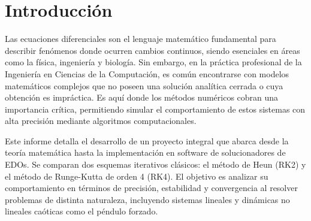 	\begin{abstract}
		Este proyecto presenta la implementación, análisis y validación de métodos numéricos para la resolución de ecuaciones diferenciales ordinarias (EDO). Se desarrollaron algoritmos en Python para el método de Heun (Runge-Kutta de orden 2) y Runge-Kutta de orden 4 (RK4). Los métodos fueron puestos a prueba resolviendo problemas de valor inicial de primer y segundo orden, así como sistemas de ecuaciones lineales y no lineales (Péndulo Forzado). Se derivaron las soluciones analíticas exactas para validar la precisión de los algoritmos. Los resultados demuestran una superioridad significativa del método RK4, logrando errores globales del orden de $10^{-8}$ frente a $10^{-4}$ del método RK2 para el mismo tamaño de paso. Adicionalmente, se realizó un estudio de convergencia experimental que confirmó los órdenes teóricos de precisión ($O(h^2)$ y $O(h^4)$) de los métodos implementados. El uso de Inteligencia Artificial como copiloto facilitó la optimización y documentación del código fuente.
	\end{abstract}
	
	\tableofcontents
	\newpage
	
	\chapter{Introducción}
	Las ecuaciones diferenciales son el lenguaje matemático fundamental para describir fenómenos donde ocurren cambios continuos, siendo esenciales en áreas como la física, ingeniería y biología. Sin embargo, en la práctica profesional de la Ingeniería en Ciencias de la Computación, es común encontrarse con modelos matemáticos complejos que no poseen una solución analítica cerrada o cuya obtención es impráctica. Es aquí donde los métodos numéricos cobran una importancia crítica, permitiendo simular el comportamiento de estos sistemas con alta precisión mediante algoritmos computacionales.
	
	Este informe detalla el desarrollo de un proyecto integral que abarca desde la teoría matemática hasta la implementación en software de solucionadores de EDOs. Se comparan dos esquemas iterativos clásicos: el método de Heun (RK2) y el método de Runge-Kutta de orden 4 (RK4). El objetivo es analizar su comportamiento en términos de precisión, estabilidad y convergencia al resolver problemas de distinta naturaleza, incluyendo sistemas lineales y dinámicas no lineales caóticas como el péndulo forzado.
	
